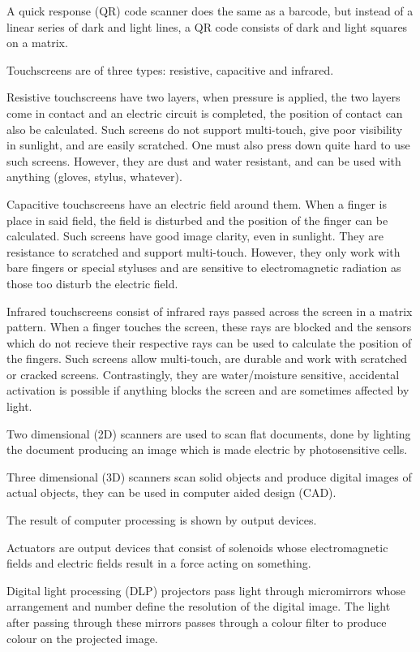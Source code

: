 A quick response (QR) code scanner does the same as a barcode, but instead of a linear series of
dark and light lines, a QR code consists of dark and light squares on a matrix.

Touchscreens are of three types: resistive, capacitive and infrared. 

Resistive touchscreens have two layers, when pressure is applied, the two layers come in contact
and an electric circuit is completed, the position of contact can also be calculated. Such screens
do not support multi-touch, give poor visibility in sunlight, and are easily scratched. One must 
also press down quite hard to use such screens. However, they are dust and water resistant, and
can be used with anything (gloves, stylus, whatever).

Capacitive touchscreens have an electric field around them. When a finger is place in said field, 
the field is disturbed and the position of the finger can be calculated. Such screens have good
image clarity, even in sunlight. They are resistance to scratched and support multi-touch. However,
they only work with bare fingers or special styluses and are sensitive to electromagnetic radiation
as those too disturb the electric field.

Infrared touchscreens consist of infrared rays passed across the screen in a matrix pattern. When
a finger touches the screen, these rays are blocked and the sensors which do not recieve their 
respective rays can be used to calculate the position of the fingers. Such screens allow 
multi-touch, are durable and work with scratched or cracked screens. Contrastingly, they are 
water/moisture sensitive, accidental activation is possible if anything blocks the screen and
are sometimes affected by light.

Two dimensional (2D) scanners are used to scan flat documents, done by lighting the document 
producing an image which is made electric by photosensitive cells.

Three dimensional (3D) scanners scan solid objects and produce digital images of actual objects,
they can be used in computer aided design (CAD).

The result of computer processing is shown by output devices.

Actuators are output devices that consist of solenoids whose electromagnetic fields and electric 
fields result in a force
acting on something.

Digital light processing (DLP) projectors pass light through micromirrors whose arrangement
and number define the resolution of the digital image. The light after passing through these 
mirrors passes through a colour filter to produce colour on the projected image.

